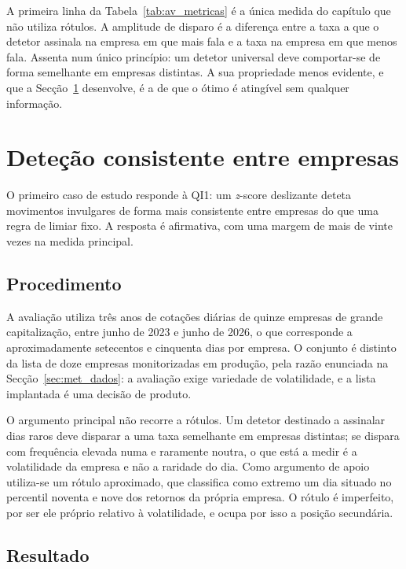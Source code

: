 A primeira linha da Tabela~\ref{tab:av_metricas} é a única medida do capítulo que não utiliza
rótulos. A amplitude de disparo é a diferença entre a taxa a que o detetor assinala na empresa em que mais
fala e a taxa na empresa em que menos fala. Assenta num único princípio: um detetor universal deve
comportar-se de forma semelhante em empresas distintas. A sua propriedade menos
evidente, e que a Secção~\ref{sec:av_qi1} desenvolve, é a de que o ótimo é atingível sem qualquer
informação.

\section{Deteção consistente entre empresas}
\label{sec:av_qi1}

O primeiro caso de estudo responde à \gls{QI}1: um \emph{z}-score deslizante deteta movimentos
invulgares de forma mais consistente entre empresas do que uma regra de limiar fixo. A resposta é
afirmativa, com uma margem de mais de vinte vezes na medida principal.

\subsection{Procedimento}

A avaliação utiliza três anos de cotações diárias de quinze empresas de grande capitalização, entre
junho de 2023 e junho de 2026, o que corresponde a aproximadamente setecentos e cinquenta dias por
empresa. O conjunto é distinto da lista de doze empresas monitorizadas em produção, pela razão
enunciada na Secção~\ref{sec:met_dados}: a avaliação exige variedade de volatilidade, e a lista
implantada é uma decisão de produto.

O argumento principal não recorre a rótulos. Um detetor destinado a assinalar dias raros deve
disparar a uma taxa semelhante em empresas distintas; se dispara com frequência elevada numa e
raramente noutra, o que está a medir é a volatilidade da empresa e não a raridade do dia. Como
argumento de apoio utiliza-se um rótulo aproximado, que classifica como extremo um dia situado no
percentil noventa e nove dos retornos da própria empresa. O rótulo é imperfeito, por ser ele próprio
relativo à volatilidade, e ocupa por isso a posição secundária.

\subsection{Resultado}

